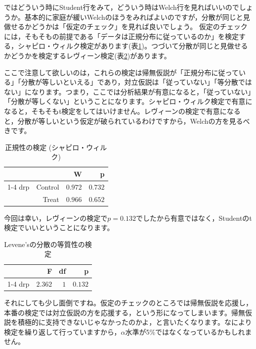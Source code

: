 \documentclass{ltjbook}
\begin{document}
ではどういう時にStudent行をみて，どういう時はWelch行を見ればいいのでしょうか。基本的に家庭が緩いWelchのほうをみればよいのですが，分散が同じと見做せるかどうかは「仮定のチェック」を見れば良いでしょう。
仮定のチェックには，そもそもの前提である「データは正規分布に従っているのか」を検定する，シャピロ・ウィルク検定があります(表\ref{tab:Shapiro-Wilk})。つづいて分散が同じと見做せるかどうかを検定するレヴィーン検定(表\ref{tab:levene})があります。

ここで注意して欲しいのは，これらの検定は帰無仮説が「正規分布に従っている」「分散が等しいといえる」であり，対立仮説は「従っていない」「等分散ではない」になります。つまり，ここでは分析結果が有意になると，「従っていない」「分散が等しくない」ということになります。シャピロ・ウィルク検定で有意になると，そもそもt検定をしてはいけません。レヴィーンの検定で有意になると，分散が等しいという仮定が破られているわけですから，Welchの方を見るべきです。

\begin{table}[h]
	\centering
	\caption{正規性の検定 (シャピロ・ウィルク)}
	\label{tab:Shapiro-Wilk}
	{
		\begin{tabular}{lrrr}
			\toprule
			 &  & W & p  \\
			\cmidrule[0.4pt]{1-4}
			drp & Control & $0.972$ & $0.732$  \\
			$ $ & Treat & $0.966$ & $0.652$  \\
			\bottomrule
		\end{tabular}
	}
\end{table}
今回は幸い，レヴィーンの検定で$p=0.132$でしたから有意ではなく，Studentのt検定でいいということになります。
\begin{table}[h]
	\centering
	\caption{Levene'sの分散の等質性の検定}
	\label{tab:levene}
	{
		\begin{tabular}{lrrr}
			\toprule
			 & F & df & p  \\
			\cmidrule[0.4pt]{1-4}
			drp & $2.362$ & $1$ & $0.132$  \\
			\bottomrule
		\end{tabular}
	}
\end{table}
それにしても少し面倒ですね。仮定のチェックのところでは帰無仮説を応援し，本番の検定では対立仮説の方を応援する，という形になってしまいます。帰無仮説を積極的に支持できないじゃなかったのかよ，と言いたくなります。なにより検定を繰り返して行っていますから，$\alpha$水準が5\%ではなくなっているかもしれません。
\end{document}
